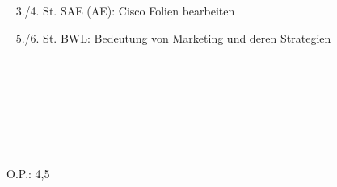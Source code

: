 {{	\textbullet~ 3./4. St. SAE (AE): Cisco Folien bearbeiten\par
	\textbullet~ 5./6. St. BWL: Bedeutung von Marketing und  deren Strategien\par
	\textbullet~ \par
	\textbullet~ \par
	\textbullet~ \par
	\textbullet~ 
	}{}{O.P.: 4,5}
}{}
\Unterschrift
\newpage
